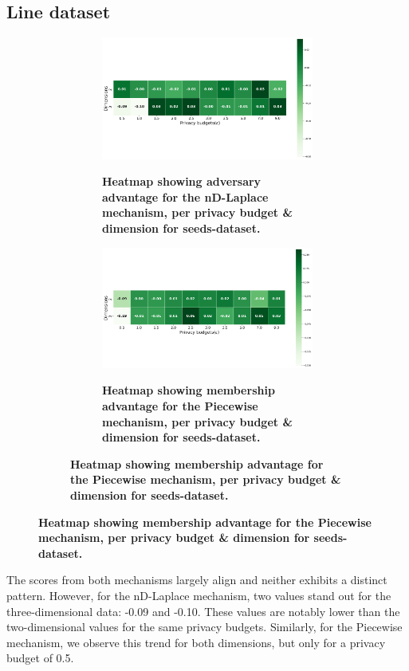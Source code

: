 \subsection{Line dataset}
\begin{figure}[H]
  \centering
  \begin{subfigure}[b]{0.80\textwidth}
    \begin{subfigure}[c]{1\textwidth}
      \caption{\textbf{Heatmap showing adversary advantage for the nD-Laplace mechanism, per privacy budget \& dimension for seeds-dataset.}}
      \includegraphics[width=1\textwidth]{Results/nd-laplace/nd-Laplace/line-dataset/attack_adv.png}
      \label{fig:privacy_line-dataset_adversial_advantage_kd-laplace}
    \end{subfigure}
    \vfill %

    \begin{subfigure}[c]{1\textwidth}
      \caption{\textbf{Heatmap showing membership advantage for the Piecewise mechanism, per privacy budget \& dimension for seeds-dataset.}}
      \includegraphics[width=1\textwidth]{Results/nd-laplace/piecewise/line-dataset/attack_adv.png}
      \label{fig:privacy_line-dataset_adversial_advantage_piecewise}
    \end{subfigure}
  \end{subfigure}
\end{figure}
The scores from both mechanisms largely align and neither exhibits a distinct pattern. However, for the nD-Laplace mechanism, two values stand out for the three-dimensional data: -0.09 and -0.10. These values are notably lower than the two-dimensional values for the same privacy budgets. Similarly, for the Piecewise mechanism, we observe this trend for both dimensions, but only for a privacy budget of 0.5.

